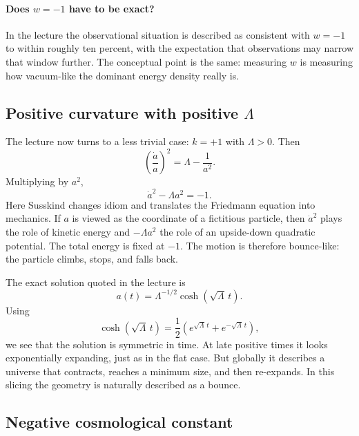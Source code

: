 \paragraph{Does \(w=-1\) have to be exact?} In the lecture the observational situation is described as consistent with \(w=-1\) to within roughly ten percent, with the expectation that observations may narrow that window further. The conceptual point is the same: measuring \(w\) is measuring how vacuum-like the dominant energy density really is.

\subsection{Positive curvature with positive \(\Lambda\)}

The lecture now turns to a less trivial case: \(k=+1\) with \(\Lambda>0\). Then
\begin{equation}
\left(\frac{\dot a}{a}\right)^2=\Lambda-\frac{1}{a^2}.
\end{equation}
Multiplying by \(a^2\),
\begin{equation}
\dot a^2-\Lambda a^2=-1.
\end{equation}
Here Susskind changes idiom and translates the Friedmann equation into mechanics. If \(a\) is viewed as the coordinate of a fictitious particle, then \(\dot a^2\) plays the role of kinetic energy and \(-\Lambda a^2\) the role of an upside-down quadratic potential. The total energy is fixed at \(-1\). The motion is therefore bounce-like: the particle climbs, stops, and falls back.

The exact solution quoted in the lecture is
\begin{equation}
a(t)=\Lambda^{-1/2}\cosh(\sqrt{\Lambda}\,t).
\end{equation}
Using
\begin{equation}
\cosh(\sqrt{\Lambda}\,t)
=
\frac12\left(e^{\sqrt{\Lambda}\,t}+e^{-\sqrt{\Lambda}\,t}\right),
\end{equation}
we see that the solution is symmetric in time. At late positive times it looks exponentially expanding, just as in the flat case. But globally it describes a universe that contracts, reaches a minimum size, and then re-expands. In this slicing the geometry is naturally described as a bounce.

\subsection{Negative cosmological constant}

